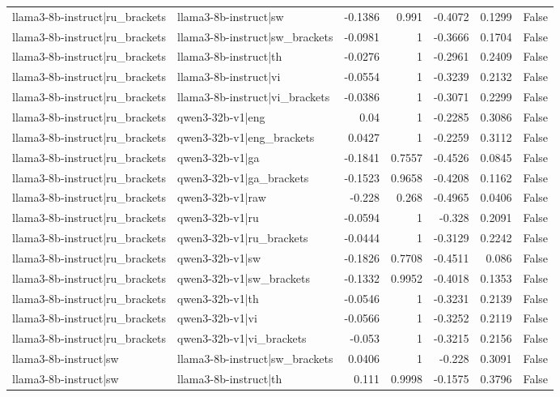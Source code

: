 \begin{table}
\begin{tabular}{l l r r r r l}
llama3-8b-instruct|ru_brackets & llama3-8b-instruct|sw & -0.1386 & 0.991 & -0.4072 & 0.1299 & False \\
llama3-8b-instruct|ru_brackets & llama3-8b-instruct|sw_brackets & -0.0981 & 1 & -0.3666 & 0.1704 & False \\
llama3-8b-instruct|ru_brackets & llama3-8b-instruct|th & -0.0276 & 1 & -0.2961 & 0.2409 & False \\
llama3-8b-instruct|ru_brackets & llama3-8b-instruct|vi & -0.0554 & 1 & -0.3239 & 0.2132 & False \\
llama3-8b-instruct|ru_brackets & llama3-8b-instruct|vi_brackets & -0.0386 & 1 & -0.3071 & 0.2299 & False \\
llama3-8b-instruct|ru_brackets & qwen3-32b-v1|eng & 0.04 & 1 & -0.2285 & 0.3086 & False \\
llama3-8b-instruct|ru_brackets & qwen3-32b-v1|eng_brackets & 0.0427 & 1 & -0.2259 & 0.3112 & False \\
llama3-8b-instruct|ru_brackets & qwen3-32b-v1|ga & -0.1841 & 0.7557 & -0.4526 & 0.0845 & False \\
llama3-8b-instruct|ru_brackets & qwen3-32b-v1|ga_brackets & -0.1523 & 0.9658 & -0.4208 & 0.1162 & False \\
llama3-8b-instruct|ru_brackets & qwen3-32b-v1|raw & -0.228 & 0.268 & -0.4965 & 0.0406 & False \\
llama3-8b-instruct|ru_brackets & qwen3-32b-v1|ru & -0.0594 & 1 & -0.328 & 0.2091 & False \\
llama3-8b-instruct|ru_brackets & qwen3-32b-v1|ru_brackets & -0.0444 & 1 & -0.3129 & 0.2242 & False \\
llama3-8b-instruct|ru_brackets & qwen3-32b-v1|sw & -0.1826 & 0.7708 & -0.4511 & 0.086 & False \\
llama3-8b-instruct|ru_brackets & qwen3-32b-v1|sw_brackets & -0.1332 & 0.9952 & -0.4018 & 0.1353 & False \\
llama3-8b-instruct|ru_brackets & qwen3-32b-v1|th & -0.0546 & 1 & -0.3231 & 0.2139 & False \\
llama3-8b-instruct|ru_brackets & qwen3-32b-v1|vi & -0.0566 & 1 & -0.3252 & 0.2119 & False \\
llama3-8b-instruct|ru_brackets & qwen3-32b-v1|vi_brackets & -0.053 & 1 & -0.3215 & 0.2156 & False \\
llama3-8b-instruct|sw & llama3-8b-instruct|sw_brackets & 0.0406 & 1 & -0.228 & 0.3091 & False \\
llama3-8b-instruct|sw & llama3-8b-instruct|th & 0.111 & 0.9998 & -0.1575 & 0.3796 & False \\

\end{tabular}
\end{table}
